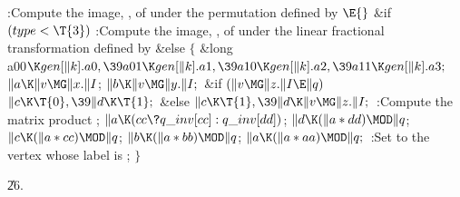 \Y\B\4:Compute the image, , of  under the permutation
defined by \X${}\E{}$\6
\&{if} ${}(\\{type}<\T{3}){}$\1\5
:Compute the image, , of  under the linear fractional
transformation defined by \X\2\6
\&{else}\5
${}\{{}$\5
\1\&{long} \\{a00}${}\K\\{gen}[\|k].\\{a0},\39\\{a01}\K\\{gen}[\|k].\\{a1},\39%
\\{a10}\K\\{gen}[\|k].\\{a2},\39\\{a11}\K\\{gen}[\|k].\\{a3};{}$\7
${}\|a\K\|v\MG\|x.\|I{}$;\5
${}\|b\K\|v\MG\|y.\|I;{}$\6
\&{if} ${}(\|v\MG\|z.\|I\E\|q){}$\1\5
${}\|c\K\T{0},\39\|d\K\T{1};{}$\2\6
\&{else}\1\5
${}\|c\K\T{1},\39\|d\K\|v\MG\|z.\|I;{}$\2\6
:Compute the matrix product \X;\6
${}\|a\K(\\{cc}\?\\{q\_inv}[\\{cc}]:\\{q\_inv}[\\{dd}]){}$;\6
${}\|d\K(\|a*\\{dd})\MOD\|q{}$;\5
${}\|c\K(\|a*\\{cc})\MOD\|q{}$;\5
${}\|b\K(\|a*\\{bb})\MOD\|q{}$;\5
${}\|a\K(\|a*\\{aa})\MOD\|q;{}$\6
:Set  to the vertex whose label is %
\X;\6
\4${}\}{}$\2\par
\U26.\fi

